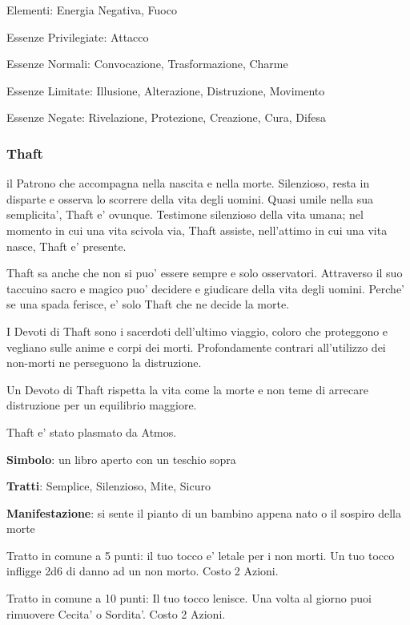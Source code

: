 \documentclass[a4paper,11pt,twoside,openany]{book}
\begin{document}
{		\bigskip
		
		Elementi: Energia Negativa, Fuoco
		
		\bigskip
		
		Essenze Privilegiate: Attacco
		
		Essenze Normali: Convocazione, Trasformazione, Charme
		
		Essenze Limitate: Illusione, Alterazione, Distruzione, Movimento
		
		Essenze Negate: Rivelazione, Protezione, Creazione, Cura, Difesa
		
		\subsubsection{Thaft}
		
		\label{thaft}
		
		il Patrono che accompagna nella nascita e nella morte. Silenzioso, resta in disparte e osserva lo scorrere della vita degli uomini. Quasi umile nella sua semplicita', Thaft e' ovunque. Testimone silenzioso della vita umana; nel momento in cui una vita scivola via, Thaft assiste, nell'attimo in cui una vita nasce, Thaft e' presente.
		
		Thaft sa anche che non si puo' essere sempre e solo osservatori. Attraverso il suo taccuino sacro e magico puo' decidere e giudicare della vita degli uomini. Perche' se una spada ferisce, e' solo Thaft che ne decide la morte.
		
		I Devoti di Thaft sono i sacerdoti dell'ultimo viaggio, coloro che proteggono e vegliano sulle anime e corpi dei morti. Profondamente contrari all'utilizzo dei non-morti ne perseguono la distruzione.
		
		Un Devoto di Thaft rispetta la vita come la morte e non teme di arrecare distruzione per un equilibrio maggiore.
		
		Thaft e' stato plasmato da Atmos.
		
		\textbf{Simbolo}: un libro aperto con un teschio sopra
		
		\textbf{Tratti}: Semplice, Silenzioso, Mite, Sicuro
		
		\textbf{Manifestazione}: si sente il pianto di un bambino appena nato o il sospiro della morte
		
		\bigskip
		
		Tratto in comune a 5 punti: il tuo tocco e' letale per i non morti. Un tuo tocco infligge 2d6 di danno ad un non morto. Costo 2 Azioni.
		
		Tratto in comune a 10 punti: Il tuo tocco lenisce. Una volta al giorno puoi rimuovere Cecita' o Sordita'. Costo 2 Azioni.
		
}
\end{document}
